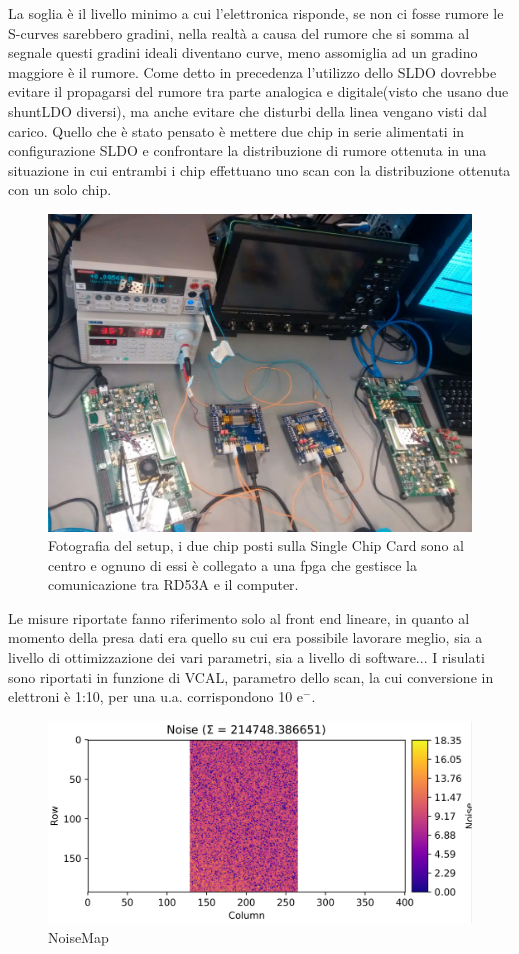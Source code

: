 La soglia è il livello minimo a cui l'elettronica risponde, se non ci fosse rumore le S-curves sarebbero gradini, nella realtà a causa del rumore che si somma al segnale questi gradini ideali diventano curve, meno assomiglia ad un gradino maggiore è il rumore.
Come detto in precedenza l'utilizzo dello SLDO dovrebbe evitare il propagarsi del rumore tra parte analogica e digitale(visto che usano due shuntLDO diversi), ma anche evitare che disturbi della linea vengano visti dal carico. Quello che è stato pensato è mettere due chip in serie alimentati in configurazione SLDO e confrontare la distribuzione di rumore ottenuta in una situazione in cui entrambi i chip effettuano uno scan con la distribuzione ottenuta con un solo chip. 
\begin{figure}
\centering
\includegraphics[scale=.2]{Immagini/chipserial}
\caption{Fotografia del setup, i due chip posti sulla Single Chip Card sono al centro e ognuno di essi è collegato a una fpga che gestisce la comunicazione tra RD53A e il computer.}
\label{chipserial}
\end{figure}
Le misure riportate fanno riferimento solo al front end lineare, in quanto al momento della presa dati era quello su cui era possibile lavorare meglio, sia a livello di ottimizzazione dei vari parametri, sia a livello di software...
I risulati sono riportati in funzione di VCAL, parametro dello scan, la cui conversione in elettroni è 1:10, per una u.a. corrispondono 10 $\mathrm{e^{-}}$.
\begin{figure}
\centering
\includegraphics[scale=.3]{Immagini/NoiseMap}
\caption{NoiseMap}
\label{NoiseMap}
\end{figure}

